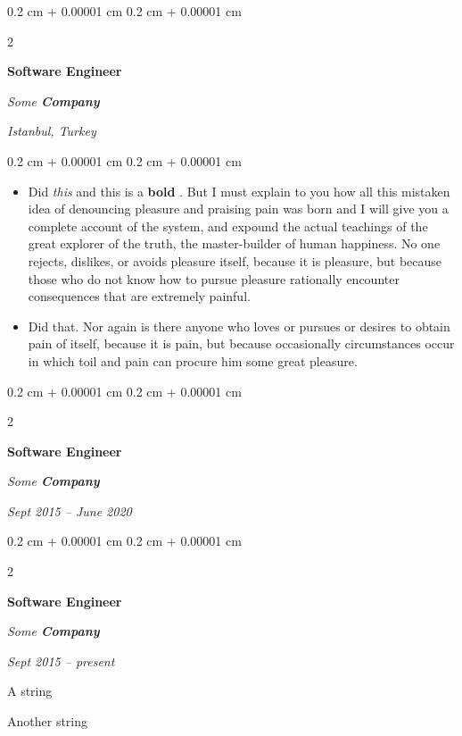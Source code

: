 \documentclass[10pt, letterpaper]{article}
\newenvironment{summary}{
    \begin{description}[
        topsep=0.10 cm,
        parsep=0.10 cm,
        partopsep=0pt,
        itemsep=0pt,
        leftmargin=0.4 cm + 10pt
    ]
}{
    \end{description}
} %
\newenvironment{highlights}{
    \begin{itemize}[
        topsep=0.10 cm,
        parsep=0.10 cm,
        partopsep=0pt,
        itemsep=0pt,
        leftmargin=0.4 cm + 10pt
    ]
}{
    \end{itemize}
} %
\newenvironment{onecolentry}{
    \begin{adjustwidth}{
        0.2 cm + 0.00001 cm
    }{
        0.2 cm + 0.00001 cm
    }
}{
    \end{adjustwidth}
} %
\newenvironment{twocolentry}[2][]{
    \onecolentry
    \def\secondColumn{#2}
    \setcolumnwidth{\fill, 4.5 cm}
    \begin{paracol}{2}
}{
    \switchcolumn \raggedleft \secondColumn
    \end{paracol}
    \endonecolentry
} %
\let\hrefWithoutArrow\href
\renewcommand{\href}[2]{\hrefWithoutArrow{#1}{\ifthenelse{\equal{#2}{}}{ }{#2 }\raisebox{.15ex}{\footnotesize \faExternalLink*}}}
\begin{document}
        \begin{twocolentry}{
        \textit{Istanbul, Turkey}    
            
        }
            \textbf{Software Engineer}
            
            \textit{Some \textbf{Company}}
        \end{twocolentry}
        \vspace{0.10 cm}
        \begin{onecolentry}
            \begin{highlights}
                \item Did \textit{this} and this is a \textbf{bold} \href{https://example.com}{link}. But I must explain to you how all this mistaken idea of denouncing pleasure and praising pain was born and I will give you a complete account of the system, and expound the actual teachings of the great explorer of the truth, the master-builder of human happiness. No one rejects, dislikes, or avoids pleasure itself, because it is pleasure, but because those who do not know how to pursue pleasure rationally encounter consequences that are extremely painful.
                \item Did that. Nor again is there anyone who loves or pursues or desires to obtain pain of itself, because it is pain, but because occasionally circumstances occur in which toil and pain can procure him some great pleasure.
            \end{highlights}
        \end{onecolentry}


        \vspace{0.2 cm}

        \begin{twocolentry}{
            
            
        \textit{Sept 2015 – June 2020}}
            \textbf{Software Engineer}
            
            \textit{Some \textbf{Company}}
        \end{twocolentry}


        \vspace{0.2 cm}

        \begin{twocolentry}{
            
            
        \textit{Sept 2015 – present}}
            \textbf{Software Engineer}
            
            \textit{Some \textbf{Company}}
        \end{twocolentry}
            \begin{summary}
                \item A string
                \item Another string
            \end{summary}
\end{document}
